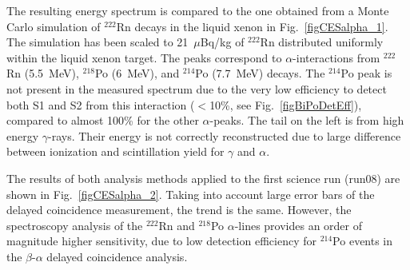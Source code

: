 The resulting energy spectrum is compared to the one obtained from a Monte Carlo simulation of $^{222}$Rn decays in the liquid xenon in Fig.~\ref{figCESalpha_1}. The simulation has been scaled to 21~$\mu$Bq/kg of $^{222}$Rn distributed uniformly within the liquid xenon target. The peaks correspond to $\alpha$-interactions from $^{222}$Rn (5.5~MeV), $^{218}$Po (6~MeV), and $^{214}$Po (7.7~MeV) decays. The $^{214}$Po peak is not present in the measured spectrum due to the very low efficiency to detect both S1 and S2 from this interaction ($<$10\%, see Fig.~\ref{figBiPoDetEff}), compared to almost 100\% for the other $\alpha$-peaks. 
The tail on the left is from high energy $\gamma$-rays. Their energy is not correctly reconstructed due to large difference between ionization and scintillation yield for $\gamma$ and $\alpha$.

The results of both analysis methods applied to the first science run (run08) are shown in Fig.~\ref{figCESalpha_2}. Taking into account large error bars of the delayed coincidence measurement, the trend is the same. However, the spectroscopy analysis of the $^{222}$Rn and $^{218}$Po $\alpha$-lines provides an order of magnitude higher sensitivity, due to low detection efficiency for $^{214}$Po events in the $\beta$-$\alpha$ delayed coincidence analysis. 






